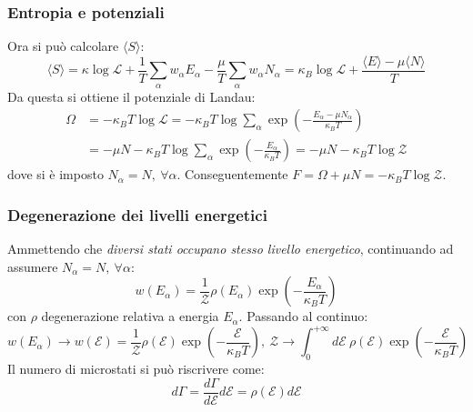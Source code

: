 \documentclass[10pt, a4paper]{scrartcl}
\numberwithin{equation}{subsection}
\theoremstyle{style1}
\theoremstyle{style2}
\begin{document}
\subsubsection{Entropia e potenziali}
Ora si pu\`o calcolare $\langle S \rangle$:
\begin{equation}
	\langle S  \rangle = \kappa \log \mathscr{L} + \frac{1}{T} \sum_{\alpha }^{} w_\alpha  E_\alpha - \frac{\mu }{T} \sum_{\alpha }^{} w_\alpha  N_\alpha = \kappa _B \log\mathscr{L} + \frac{\langle E \rangle - \mu  \langle N \rangle}{T}
\end{equation}
Da questa si ottiene il potenziale di Landau:
\begin{equation}
	\begin{split}
		\Omega &= -\kappa _B T \log \mathscr{L}  = -\kappa _B T \log \sum_{\alpha }^{} \exp \left(- \frac{E_\alpha -\mu N_\alpha }{\kappa _B T}\right)  \\
		       &= -\mu  N - \kappa _B T \log \sum_{\alpha }^{} \exp \left( -\frac{E_\alpha }{\kappa _B T}\right) = -\mu  N- \kappa _B T \log\mathscr{Z}
	\end{split}
\end{equation}
dove si \`e imposto $N_\alpha  = N , \ \forall \alpha $. Conseguentemente $F = \Omega +\mu N = - \kappa _B T \log\mathscr{Z}$. 

\subsubsection{Degenerazione dei livelli energetici}

Ammettendo che \textit{diversi stati occupano stesso livello energetico}, continuando ad assumere $N_\alpha  = N , \ \forall \alpha $:
\begin{equation}
	w(E_\alpha )= \frac{1}{\mathscr{Z}} \rho (E_\alpha ) \exp \left( - \frac{E_\alpha }{\kappa _B T}\right) 
\end{equation}
con $\rho $ degenerazione relativa a energia $E_\alpha $. Passando al continuo:
\begin{equation}
	w(E_\alpha ) \to w (\mathscr{E}) = \frac{1}{\mathscr{Z}} \rho (\mathscr{E}) \exp \left(- \frac{\mathscr{E}}{\kappa _BT}\right) , \ \mathscr{Z}\to \int_{0} ^{+\infty} d \mathscr{E}\ \rho (\mathscr{E}) \exp\left(- \frac{\mathscr{E}}{\kappa _BT}\right) 
\end{equation}
Il numero di microstati si pu\`o riscrivere come:
\begin{equation}
	d\Gamma = \frac{d\Gamma}{d \mathscr{E}}d\mathscr{E} = \rho (\mathscr{E}) d \mathscr{E}
\end{equation}
\end{document}
